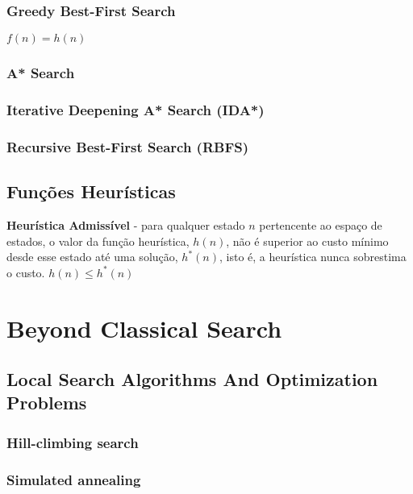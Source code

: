 \documentclass[11pt]{article}
\begin{document}
\subsubsection{Greedy Best-First Search}

$f(n) = h(n)$

\subsubsection{A* Search}



\subsubsection{Iterative Deepening A* Search (IDA*)}



\subsubsection{Recursive Best-First Search (RBFS)}


\newpage
\subsection{Funções Heurísticas}



\textbf{Heurística Admissível} - para qualquer estado $n$ pertencente ao espaço de estados, o valor da função heurística, $h(n)$, não é superior ao custo mínimo desde esse estado até uma solução, $h^*(n)$, isto é, a heurística nunca sobrestima o custo. $h(n)\leq h^*(n)$

\newpage
\section{Beyond Classical Search}



\subsection{Local Search Algorithms And Optimization Problems}

\subsubsection{Hill-climbing search}


\subsubsection{Simulated annealing}
\end{document}

